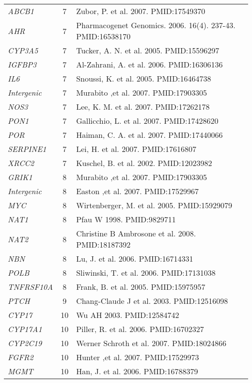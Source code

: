 \documentclass[10pt]{article}
\begin{document}
\begin{landscape}
\begin{center}
\begin{longtable}[H]{lcl}
\textit{ABCB1} & 7 & Zubor, P.  et al. 2007. PMID:17549370\\[2pt]
\textit{AHR} & 7 & Pharmacogenet Genomics. 2006. 16(4). 237-43. PMID:16538170\\[2pt]
\textit{CYP3A5} & 7 & Tucker, A. N.  et al. 2005. PMID:15596297\\[2pt]
\textit{IGFBP3} & 7 & Al-Zahrani, A.  et al. 2006. PMID:16306136\\[2pt]
\textit{IL6} & 7 & Snoussi, K.  et al. 2005. PMID:16464738\\[2pt]
\textit{Intergenic} & 7 & Murabito ,et al. 2007. PMID:17903305\\[2pt]
\textit{NOS3} & 7 & Lee, K. M.  et al. 2007. PMID:17262178\\[2pt]
\textit{PON1} & 7 & Gallicchio, L.  et al. 2007. PMID:17428620\\[2pt]
\textit{POR} & 7 & Haiman, C. A.  et al. 2007. PMID:17440066\\[2pt]
\textit{SERPINE1} & 7 & Lei, H.  et al. 2007. PMID:17616807\\[2pt]
\textit{XRCC2} & 7 & Kuschel, B.  et al. 2002. PMID:12023982\\[2pt]
\textit{GRIK1} & 8 & Murabito ,et al. 2007. PMID:17903305\\[2pt]
\textit{Intergenic} & 8 & Easton ,et al. 2007. PMID:17529967\\[2pt]
\textit{MYC} & 8 & Wirtenberger, M.  et al. 2005. PMID:15929079\\[2pt]
\textit{NAT1} & 8 & Pfau W 1998. PMID:9829711\\[2pt]
\textit{NAT2} & 8 & Christine B Ambrosone  et al.  2008. PMID:18187392\\[2pt]
\textit{NBN} & 8 & Lu, J.  et al. 2006. PMID:16714331\\[2pt]
\textit{POLB} & 8 & Sliwinski, T.  et al. 2006. PMID:17131038\\[2pt]
\textit{TNFRSF10A} & 8 & Frank, B.  et al. 2005. PMID:15975957\\[2pt]
\textit{PTCH} & 9 & Chang-Claude J et al. 2003. PMID:12516098\\[2pt]
\textit{CYP17} & 10 & Wu AH 2003. PMID:12584742\\[2pt]
\textit{CYP17A1} & 10 & Piller, R.  et al. 2006. PMID:16702327\\[2pt]
\textit{CYP2C19} & 10 & Werner Schroth  et al.  2007. PMID:18024866\\[2pt]
\textit{FGFR2} & 10 & Hunter ,et al. 2007. PMID:17529973\\[2pt]
\textit{MGMT} & 10 & Han, J.  et al. 2006. PMID:16788379\\[2pt]

\end{longtable}
\end{center}
\end{landscape}
\end{document}
